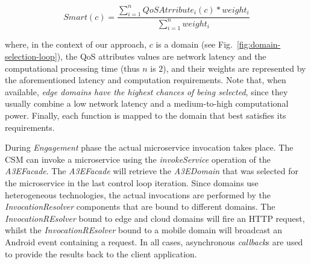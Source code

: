 \begin{equation}
Smart(c) = \frac{\sum_{i=1}^{n} QoSAtrribute_i(c)*weight_i}{\sum_{i=1}^{n}weight_i} \label{eq:smart}
\end{equation}

\noindent
where, in the context of our approach, $c$ is a domain (see Fig.~\ref{fig:domain-selection-loop}), the QoS attributes values are network latency and the computational processing time (thus $n$ is $2$), and their weights are represented by the aforementioned latency and computation requirements. Note that, when available, \textit{edge domains have the highest chances of being selected}, since they usually combine a low network latency and a medium-to-high computational power. Finally, each function is mapped to the domain that best satisfies its requirements. 


During \textit{Engagement} phase the actual microservice invocation takes place. The CSM can invoke a microservice using the \textit{invokeService} operation of the  \textit{A3EFacade}. %
The \textit{A3EFacade} will retrieve the \textit{A3EDomain} that was selected for the microservice in the last control loop iteration. Since domains use heterogeneous technologies, the actual invocations are performed by the \textit{InvocationResolver} components that are bound to different domains. 
The \textit{InvocationREsolver} bound to edge and cloud domains will fire an HTTP request, whilst the \textit{InvocationREsolver} bound to a mobile domain will broadcast an Android event containing a request. In all cases, asynchronous \textit{callback}s are used to provide the results back to the client application. %


